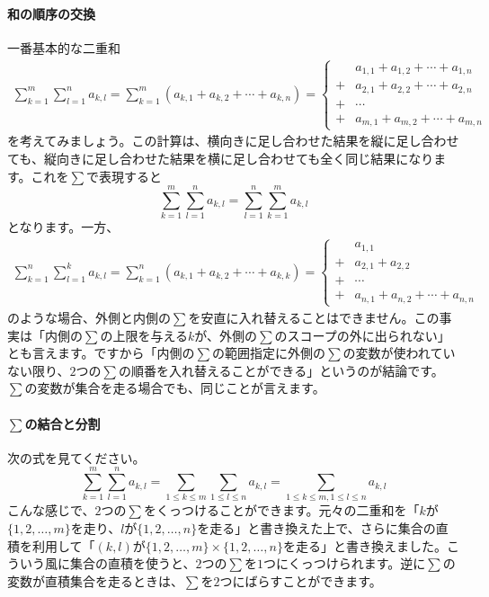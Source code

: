 \paragraph{和の順序の交換} 一番基本的な二重和
\begin{align*}
\sum_{k = 1}^m \sum_{l  = 1}^n a_{k, l} 
= \sum_{k = 1}^m (a_{k, 1} + a_{k, 2} + \cdots + a_{k, n} )
=
\begin{cases}
 &a_{1, 1} + a_{1, 2} + \cdots + a_{1, n} \\
+ &a_{2, 1} + a_{2, 2} + \cdots + a_{2, n} \\
+ &\cdots \\
+ &a_{m, 1} + a_{m, 2} + \cdots + a_{m, n}
\end{cases}
\end{align*}
を考えてみましょう。この計算は、横向きに足し合わせた結果を縦に足し合わせても、縦向きに足し合わせた結果を横に足し合わせても全く同じ結果になります。これを$\sum$で表現すると
\[
\sum_{k = 1}^m \sum_{l  = 1}^n a_{k, l} =
\sum_{l  = 1}^n \sum_{k = 1}^m a_{k, l} 
\]
となります。一方、
\begin{align*}
\sum_{k = 1}^n \sum_{l  = 1}^k a_{k,l}
= \sum_{k = 1}^n (a_{k, 1} + a_{k, 2} + \cdots + a_{k, k})
=
\begin{cases}
 &a_{1, 1} \\
+ &a_{2, 1} + a_{2, 2} \\
+ &\cdots \\
+ &a_{n, 1} + a_{n, 2} + \cdots + a_{n, n}
\end{cases}
\end{align*}
のような場合、外側と内側の$\sum$を安直に入れ替えることはできません。この事実は「内側の$\sum$の上限を与える$k$が、外側の$\sum$のスコープの外に出られない」とも言えます。ですから「内側の$\sum$の範囲指定に外側の$\sum$の変数が使われていない限り、$2$つの$\sum$の順番を入れ替えることができる」というのが結論です。$\sum$の変数が集合を走る場合でも、同じことが言えます。

\paragraph{$\sum$の結合と分割} 次の式を見てください。
\[
\sum_{k = 1}^m \sum_{l = 1}^n a_{k, l} = \sum_{1\leq k\leq m} \sum_{1\leq l\leq n} a_{k, l} = \sum_{1\leq k \leq m, 1\leq l\leq n} a_{k, l}
\]
こんな感じで、$2$つの$\sum$をくっつけることができます。元々の二重和を「$k$が$\{1,2,\ldots,m\}$を走り、$l$が$\{1,2,\ldots,n\}$を走る」と書き換えた上で、さらに集合の直積を利用して「$(k,l)$が$\{1,2,\ldots,m\}\times\{1,2,\ldots,n\}$を走る」と書き換えました。こういう風に集合の直積を使うと、$2$つの$\sum$を$1$つにくっつけられます。逆に$\sum$の変数が直積集合を走るときは、$\sum$を$2$つにばらすことができます。

